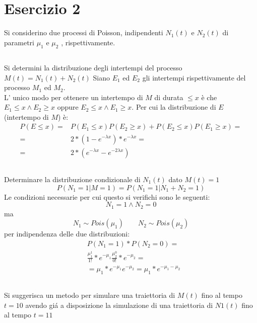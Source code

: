 \documentclass[a4paper]{article}
\begin{document}
\section{Esercizio 2}
Si considerino due processi di Poisson, indipendenti $N_1(t)$ e $ N_2(t)$ di parametri $\mu_1$ e $\mu_2$ , rispettivamente.
\subsection{}
Si determini la distribuzione degli intertempi del processo $M (t) = N_1 (t) + N_2 (t)$
Siano $E_1$ ed $E_2$ gli intertempi rispettivamente del processo $M_1$ ed $M_2$.\\
L' unico modo per ottenere un intertempo di $M$ di durata $\leq x$ è che $E_1 \leq x \wedge E_2 \geq x$ oppure $E_2 \leq x \wedge E_1 \geq x$.
Per cui la distribuzione di $E$ (intertempo di $M$) è:
\begin{align*}
	P(E \leq x) =& P(E_1 \leq x) P(E_2 \geq x) + P(E_2 \leq x)P(E_1 \geq x)=\\
	=&2 * (1-e^{-\lambda x}) * e^{-\lambda x}=\\
	=& 2 * (e^{-\lambda x} - e^{-2\lambda x})
\end{align*}

\subsection{}
Determinare la distribuzione condizionale di $N_1 (t)$ dato $ M (t) = 1$
$$P(N_1 = 1 | M = 1) = P (N_1 = 1 | N_1 + N_2 = 1)$$
Le condizioni necessarie per cui questo si verifichi sono le seguenti:
$$N_1 = 1 \wedge N_2 = 0$$
ma 
$$N_1 \sim Pois(\mu_1) \qquad N_2 \sim Pois(\mu_2)$$
per indipendenza delle due distribuzioni:
\begin{align*}
	&P(N_1 = 1) * P(N_2 = 0) = \\
	&\frac{\mu_1^1}{1!}*e^{-\mu_1}\frac{\mu_2^0}{0!}*e^{-\mu_2}=\\
	&= \mu_1*e^{-\mu_1}e^{-\mu_2}= \mu_1*e^{-\mu_1-\mu_2}
\end{align*}

\subsection{}
Si suggerisca un metodo per simulare una traiettoria di $M (t)$ fino al tempo $ t = 10$ avendo giá a disposizione la simulazione di una traiettoria di $ N1 (t) $ fino al tempo $ t = 11$\\
\end{document}
